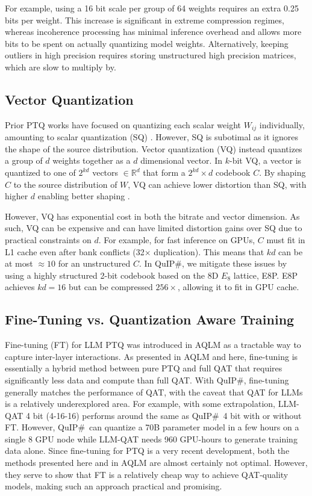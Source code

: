 For example, using a 16 bit scale per group of 64 weights requires an extra 0.25 bits per weight. This increase is significant in extreme compression regimes, whereas incoherence processing has minimal inference overhead and allows more bits to be spent on actually quantizing model weights. Alternatively, keeping outliers in high precision requires storing unstructured high precision matrices, which are slow to multiply by.

\subsection{Vector Quantization}
\label{sec:vq}
Prior PTQ works have focused on quantizing each scalar weight $W_{ij}$ individually, amounting to scalar quantization (SQ) \cite{chee2023quip, awq, omniquant}. However, SQ is subotimal as it ignores the shape of the source distribution. Vector quantization (VQ) instead quantizes a group of $d$ weights together as a $d$ dimensional vector. In $k$-bit VQ, a vector is quantized to one of $2^{kd}$ vectors $\in \mathbb{R}^d$ that form a $2^{kd} \times d$ codebook $C$. By shaping $C$ to the source distribution of $W$, VQ can achieve lower distortion than SQ, with higher $d$ enabling better shaping \cite{kostina}.

However, VQ has exponential cost in both the bitrate and vector dimension. As such, VQ can be expensive and can have limited distortion gains over SQ due to practical constraints on $d$. For example, for fast inference on GPUs, $C$ must fit in L1 cache even after bank conflicts (32$\times$ duplication). This means that $kd$ can be at most $\approx10$ for an unstructured $C$. In QuIP$\#$, we mitigate these issues by using a highly structured 2-bit codebook based on the 8D $E_8$ lattice, E8P. E8P achieves $kd=16$ but can be compressed $256\times$, allowing it to fit in GPU cache.

\subsection{Fine-Tuning vs. Quantization Aware Training}
\label{sec:FTvsQAT}

Fine-tuning (FT) for LLM PTQ was introduced in AQLM \cite{aqlm} as a tractable way to capture inter-layer interactions. As presented in AQLM and here, fine-tuning is essentially a hybrid method between pure PTQ and full QAT that requires significantly less data and compute than full QAT. With QuIP$\#$, fine-tuning generally matches the performance of QAT, with the caveat that QAT for LLMs is a relatively underexplored area. For example, with some extrapolation, LLM-QAT \cite{liu2023llmqat} 4 bit (4-16-16) performs around the same as QuIP$\#$\  4 bit with or without FT. However, QuIP$\#$\  can quantize a 70B parameter model in a few hours on a single 8 GPU node while LLM-QAT needs 960 GPU-hours to generate training data alone. Since fine-tuning for PTQ is a very recent development, both the methods presented here and in AQLM are almost certainly not optimal. However, they serve to show that FT is a relatively cheap way to achieve QAT-quality models, making such an approach practical and promising. 

